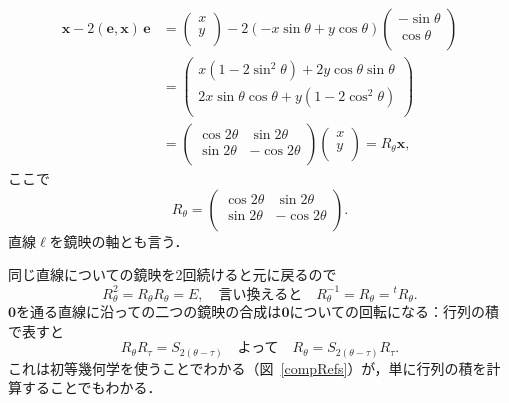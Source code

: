 \[
\begin{split}
     \mathbf x-2 (\mathbf e,\mathbf x)\,\mathbf e
     &=
     \begin{pmatrix}
          x\\
          y\\
     \end{pmatrix}
     -2(-x\sin\theta+y\cos\theta)
     \begin{pmatrix}
          -\sin\theta\\
          \cos\theta\\
     \end{pmatrix}\\
     &=
     \begin{pmatrix}
          x(1-2\sin^2\theta)+2y\cos\theta\sin\theta\\
          2x\sin \theta \cos\theta+y(1-2\cos^2\theta)\\
     \end{pmatrix}\\
     &=\begin{pmatrix}
          \cos 2\theta &\sin 2\theta\\
          \sin 2\theta&-\cos 2\theta\\
     \end{pmatrix}
     \begin{pmatrix}
          x\\
          y\\
     \end{pmatrix}
     =R_{\theta}\mathbf x,
\end{split}
\]
ここで
\[
     R_{\theta}
     =
     \begin{pmatrix}
          \cos 2\theta &\sin 2\theta\\
          \sin 2\theta&-\cos 2\theta\\
     \end{pmatrix}.
\]
直線$\ell$を鏡映の軸とも言う．

同じ直線についての鏡映を2回続けると元に戻るので
\begin{equation}\label{rel2}
     R_{\theta}^2=R_{\theta}R_{\theta}=E,
     \quad\text{言い換えると}\quad 
     R_{\theta}^{-1} =R_{\theta}={}^tR_{\theta}.
\end{equation}
$\mathbf 0$を通る直線に沿っての二つの鏡映の合成は$\mathbf 0$についての回転になる：行列の積で表すと
\begin{equation}\label{rel3}
     R_{\theta}R_{\tau}=S_{2(\theta-\tau)}
     \quad\text{よって}\quad
     R_{\theta}=S_{2(\theta-\tau)}R_{\tau}.
\end{equation}
これは初等幾何学を使うことでわかる（図~\ref{compRefs}）が，単に行列の積を計算することでもわかる．

